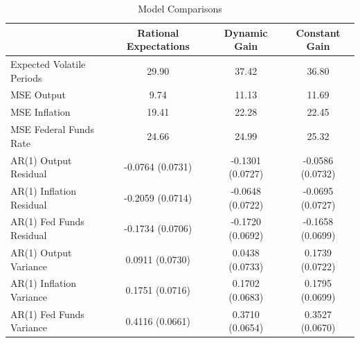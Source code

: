 \documentclass[12pt]{article}
\begin{document}
\begin{table}[ht]\label{tb:comp}\caption{Model Comparisons}\vspace{2pc}
\begin{tabular}{|l|c|c|c|}\hline
 & Rational Expectations & Dynamic Gain & Constant Gain \\ \hline 
Expected Volatile Periods & 29.90 & 37.42 & 36.80 \\ \hline 
MSE Output & 9.74 & 11.13 & 11.69 \\ 
MSE Inflation & 19.41 & 22.28 & 22.45 \\ 
MSE Federal Funds Rate & 24.66 & 24.99 & 25.32 \\ \hline 
AR(1) Output Residual & -0.0764 (0.0731) & -0.1301 (0.0727) & -0.0586 (0.0732) \\ 
AR(1) Inflation Residual & -0.2059 (0.0714) & -0.0648 (0.0722) & -0.0695 (0.0727) \\ 
AR(1) Fed Funds Residual & -0.1734 (0.0706) & -0.1720 (0.0692) & -0.1658 (0.0699) \\ \hline 
AR(1) Output Variance & 0.0911 (0.0730) & 0.0438 (0.0733) & 0.1739 (0.0722) \\ 
AR(1) Inflation Variance & 0.1751 (0.0716) & 0.1702 (0.0683) & 0.1795 (0.0699) \\ 
AR(1) Fed Funds Variance & 0.4116 (0.0661) & 0.3710 (0.0654) & 0.3527 (0.0670) \\ \hline 
\end{tabular}
\end{table}
\end{document}
